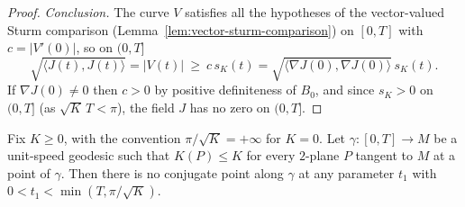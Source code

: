\begin{proof}
{\em Conclusion.} The curve $V$ satisfies all the hypotheses of the
vector-valued Sturm comparison (Lemma~\ref{lem:vector-sturm-comparison})
on $[0,T]$ with $c=|V'(0)|$, so on $(0,T]$
$$\sqrt{\langle J(t),J(t)\rangle}=|V(t)|\ \ge\ c\,s_K(t)
=\sqrt{\langle\nabla J(0),\nabla J(0)\rangle}\,s_K(t).$$
If $\nabla J(0)\not=0$ then $c>0$ by positive definiteness of $B_0$, and
since $s_K>0$ on $(0,T]$ (as $\sqrt K\,T<\pi$), the field $J$ has no zero
on $(0,T]$.
\end{proof}

\begin{lemma}
\label{lem:conjugate-sturm}
\leanok
Fix $K\ge 0$, with the convention $\pi/\sqrt K=+\infty$ for $K=0$.
Let $\gamma\colon[0,T]\to M$ be a unit-speed geodesic such that
$K(P)\le K$ for every $2$-plane $P$ tangent to $M$ at a point of
$\gamma$. Then there is no conjugate point along $\gamma$ at any
parameter $t_1$ with $0<t_1<\min(T,\pi/\sqrt K)$.
\end{lemma}

